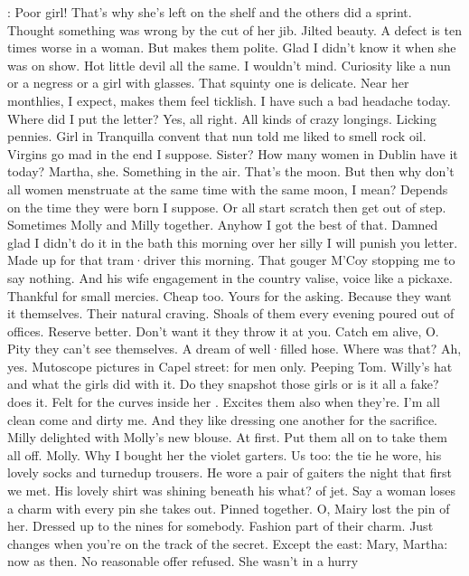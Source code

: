 \Bloom:
Poor girl!
That's why she's left
on the shelf and the others did a sprint.
Thought something was wrong by
the cut of her jib.
Jilted beauty.
A defect is ten times worse in a woman.
But makes them polite.
Glad I didn't know it when she was on show.
Hot little devil all the same.
I wouldn't mind.
Curiosity like a nun or a
negress or a girl with glasses.
That squinty one is delicate.
Near her monthlies,
I expect,
makes them feel ticklish.
I have such a bad headache today.
Where did I put the letter?
Yes,
all right.
All kinds of crazy
longings.
Licking pennies.
Girl in Tranquilla convent that nun told
me liked to smell rock oil.
Virgins go mad in the end I suppose.
Sister?
How many women in Dublin have it today?
Martha,
she.
Something
in the air.
That's the moon.
But then why don't all women menstruate
at the same time with the same moon,
I mean?
Depends on the time
they were born I suppose.
Or all start scratch then get out of step.
Sometimes Molly and Milly together.
Anyhow I got the best of that.
Damned glad I didn't do it in the bath this morning over her silly
I will punish you letter.
Made up for that tram·driver this morning.
That gouger M'Coy stopping me to say nothing.
And his wife
engagement in the country valise,
voice like a pickaxe.
Thankful for small
mercies.
Cheap too.
Yours for the asking.
Because they want it themselves.
Their natural craving.
Shoals of them every evening poured out of offices.
Reserve better.
Don't want it they throw it at you.
Catch em alive,
O.
Pity they can't see themselves.
A dream of well·filled hose.
Where was
that?
Ah,
yes.
Mutoscope pictures in Capel street:
for men only.
Peeping
Tom.
Willy's hat and what the girls did with it.
Do they snapshot
those girls or is it all a fake?
 does it.
Felt for the
curves inside her .
Excites them also when they're.
I'm all
clean come and dirty me.
And they like dressing one another for the
sacrifice.
Milly delighted with Molly's new blouse.
At first.
Put them all on to take them all off.
Molly.
Why I bought her the violet garters.
Us too:
the tie he wore,
his lovely socks and turnedup trousers.
He wore a pair of gaiters the night that first we met.
His lovely
shirt was shining beneath his what?
of jet.
Say a woman loses a charm with
every pin she takes out.
Pinned together.
O,
Mairy lost the pin of her.
Dressed up to the nines for somebody.
Fashion part of their charm.
Just
changes when you're on the track of the secret.
Except the east:
Mary,
Martha:
now as then.
No reasonable offer refused.
She wasn't in a hurry
